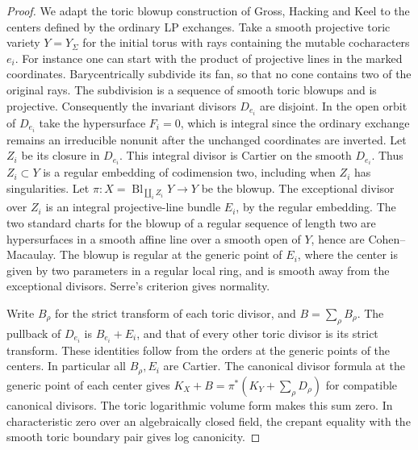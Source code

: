 \documentclass[11pt,reqno]{amsart}
\numberwithin{equation}{section}
\theoremstyle{definition}
\theoremstyle{remark}
\begin{document}
\begin{proof}
We adapt the toric blowup construction of Gross, Hacking and Keel
\cite[\S3, Theorem~3.9]{GHK} to the centers defined by the ordinary LP
exchanges. Take a smooth projective toric variety \(Y=Y_\Sigma\) for the
initial torus with rays containing the mutable cocharacters \(e_i\).
For instance one can start with the product of projective lines in
the marked coordinates. Barycentrically subdivide its fan, so that
no cone contains two of the original rays. The subdivision is a
sequence of smooth toric blowups and is projective. Consequently
the invariant divisors \(D_{e_i}\) are disjoint. In the open orbit
of \(D_{e_i}\) take the hypersurface \(F_i=0\), which is integral
since the ordinary exchange remains an irreducible nonunit after
the unchanged coordinates are inverted. Let \(Z_i\) be its closure
in \(D_{e_i}\). This integral divisor is
Cartier on the smooth \(D_{e_i}\). Thus \(Z_i\subset Y\) is a
regular embedding of codimension two, including when \(Z_i\) has
singularities. Let \(\pi:X=\operatorname{Bl}_{\coprod_i Z_i}Y\to Y\) be the blowup.
The exceptional divisor over \(Z_i\) is an integral projective-line
bundle \(E_i\), by the regular embedding. The two standard charts
for the blowup of a regular sequence of length two are hypersurfaces
in a smooth affine line over a smooth open of \(Y\), hence are
Cohen--Macaulay. The blowup is regular at the generic point of
\(E_i\), where the center is given by two parameters in a regular
local ring, and is smooth away from the exceptional divisors.
Serre's criterion gives normality.

Write \(B_\rho\) for the strict transform of each toric divisor,
and \(B=\sum_\rho B_\rho\). The pullback of \(D_{e_i}\) is
\(B_{e_i}+E_i\), and that of every other toric divisor is its
strict transform. These identities follow from the orders at the
generic points of the centers. In particular all \(B_\rho,E_i\)
are Cartier. The canonical divisor formula at the generic point
of each center gives \(K_X+B=\pi^*(K_Y+\sum_\rho D_\rho)\) for
compatible canonical divisors. The toric logarithmic volume form
makes this sum zero. In characteristic zero over an algebraically
closed field, the crepant equality with the smooth toric boundary
pair gives log canonicity.


\end{proof}
\end{document}
